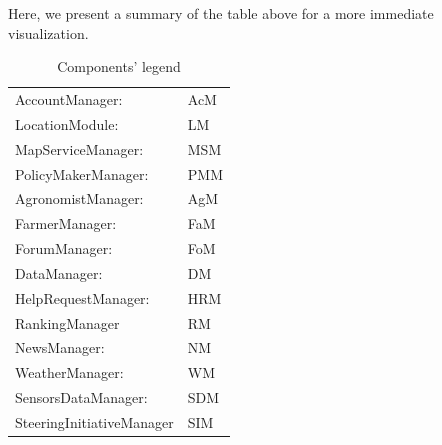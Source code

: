\documentclass[table, 12pt]{article}
\begin{document}
Here, we present a summary of the table above for a more immediate visualization.
\begin{table}[H]
    \centering
    \begin{tabular}{|l l|}
        \hline
        AccountManager:& AcM\\
        LocationModule:& LM\\
        MapServiceManager:& MSM\\
        PolicyMakerManager:& PMM\\
        AgronomistManager:& AgM\\
        FarmerManager:& FaM\\
        ForumManager:& FoM\\
        DataManager:& DM\\
        HelpRequestManager:& HRM\\
        RankingManager & RM\\
        NewsManager:& NM\\
        WeatherManager:& WM\\
        SensorsDataManager:& SDM\\
        SteeringInitiativeManager& SIM\\\hline
        
    \end{tabular}
    \caption{Components' legend}
\end{table}
\newpage
\setlength\LTleft{-2.5cm}
\end{document}
